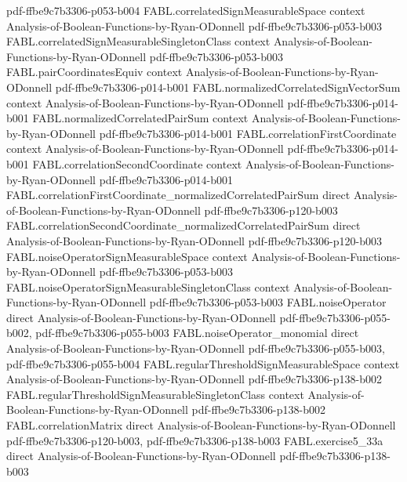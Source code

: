 \begin{theorem}
  {pdf-ffbe9c7b3306-p053-b004}
\proofstep
  {FABL.correlatedSignMeasurableSpace}
  {context}
  {Analysis-of-Boolean-Functions-by-Ryan-ODonnell}
  {pdf-ffbe9c7b3306-p053-b003}
\proofstep
  {FABL.correlatedSignMeasurableSingletonClass}
  {context}
  {Analysis-of-Boolean-Functions-by-Ryan-ODonnell}
  {pdf-ffbe9c7b3306-p053-b003}
\proofstep
  {FABL.pairCoordinatesEquiv}
  {context}
  {Analysis-of-Boolean-Functions-by-Ryan-ODonnell}
  {pdf-ffbe9c7b3306-p014-b001}
\proofstep
  {FABL.normalizedCorrelatedSignVectorSum}
  {context}
  {Analysis-of-Boolean-Functions-by-Ryan-ODonnell}
  {pdf-ffbe9c7b3306-p014-b001}
\proofstep
  {FABL.normalizedCorrelatedPairSum}
  {context}
  {Analysis-of-Boolean-Functions-by-Ryan-ODonnell}
  {pdf-ffbe9c7b3306-p014-b001}
\proofstep
  {FABL.correlationFirstCoordinate}
  {context}
  {Analysis-of-Boolean-Functions-by-Ryan-ODonnell}
  {pdf-ffbe9c7b3306-p014-b001}
\proofstep
  {FABL.correlationSecondCoordinate}
  {context}
  {Analysis-of-Boolean-Functions-by-Ryan-ODonnell}
  {pdf-ffbe9c7b3306-p014-b001}
\proofstep
  {FABL.correlationFirstCoordinate_normalizedCorrelatedPairSum}
  {direct}
  {Analysis-of-Boolean-Functions-by-Ryan-ODonnell}
  {pdf-ffbe9c7b3306-p120-b003}
\proofstep
  {FABL.correlationSecondCoordinate_normalizedCorrelatedPairSum}
  {direct}
  {Analysis-of-Boolean-Functions-by-Ryan-ODonnell}
  {pdf-ffbe9c7b3306-p120-b003}
\proofstep
  {FABL.noiseOperatorSignMeasurableSpace}
  {context}
  {Analysis-of-Boolean-Functions-by-Ryan-ODonnell}
  {pdf-ffbe9c7b3306-p053-b003}
\proofstep
  {FABL.noiseOperatorSignMeasurableSingletonClass}
  {context}
  {Analysis-of-Boolean-Functions-by-Ryan-ODonnell}
  {pdf-ffbe9c7b3306-p053-b003}
\proofstep
  {FABL.noiseOperator}
  {direct}
  {Analysis-of-Boolean-Functions-by-Ryan-ODonnell}
  {pdf-ffbe9c7b3306-p055-b002,
    pdf-ffbe9c7b3306-p055-b003}
\proofstep
  {FABL.noiseOperator_monomial}
  {direct}
  {Analysis-of-Boolean-Functions-by-Ryan-ODonnell}
  {pdf-ffbe9c7b3306-p055-b003,
    pdf-ffbe9c7b3306-p055-b004}
\proofstep
  {FABL.regularThresholdSignMeasurableSpace}
  {context}
  {Analysis-of-Boolean-Functions-by-Ryan-ODonnell}
  {pdf-ffbe9c7b3306-p138-b002}
\proofstep
  {FABL.regularThresholdSignMeasurableSingletonClass}
  {context}
  {Analysis-of-Boolean-Functions-by-Ryan-ODonnell}
  {pdf-ffbe9c7b3306-p138-b002}
\proofstep
  {FABL.correlationMatrix}
  {direct}
  {Analysis-of-Boolean-Functions-by-Ryan-ODonnell}
  {pdf-ffbe9c7b3306-p120-b003,
    pdf-ffbe9c7b3306-p138-b003}
\proofstep
  {FABL.exercise5_33a}
  {direct}
  {Analysis-of-Boolean-Functions-by-Ryan-ODonnell}
  {pdf-ffbe9c7b3306-p138-b003}

\end{theorem}
